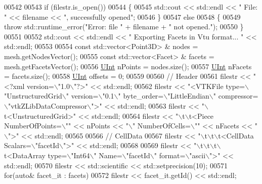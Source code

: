 \begin{DoxyCode}
00542 
00543     \textcolor{keywordflow}{if} (filestr.is\_open())
00544     \{
00545         std::cout << std::endl << \textcolor{stringliteral}{" File: "} << filename << \textcolor{stringliteral}{", successfully opened"};
00546     \}
00547     \textcolor{keywordflow}{else}
00548     \{
00549         \textcolor{keywordflow}{throw} std::runtime\_error(\textcolor{stringliteral}{"Error: file "} + filename + \textcolor{stringliteral}{" not opened."});
00550     \}
00551 
00552     std::cout << std::endl << \textcolor{stringliteral}{" Exporting Facets in Vtu format... "} << std::endl;
00553 
00554     \textcolor{keyword}{const} std::vector<Point3D> & nodes = mesh.getNodesVector();
00555     \textcolor{keyword}{const} std::vector<Facet> & facets = mesh.getFacetsVector();
00556     \hyperlink{namespaceFVCode3D_a4bf7e328c75d0fd504050d040ebe9eda}{UInt} nPoints = nodes.size();
00557     \hyperlink{namespaceFVCode3D_a4bf7e328c75d0fd504050d040ebe9eda}{UInt} nFacets = facets.size();
00558     \hyperlink{namespaceFVCode3D_a4bf7e328c75d0fd504050d040ebe9eda}{UInt} offsets = 0;
00559 
00560     \textcolor{comment}{// Header}
00561     filestr << \textcolor{stringliteral}{"<?xml version=\(\backslash\)"1.0\(\backslash\)"?>"} << std::endl;
00562     filestr << \textcolor{stringliteral}{"<VTKFile type=\(\backslash\)"UnstructuredGrid\(\backslash\)" version=\(\backslash\)"0.1\(\backslash\)" byte\_order=\(\backslash\)"LittleEndian\(\backslash\)" compressor=
      \(\backslash\)"vtkZLibDataCompressor\(\backslash\)">"} << std::endl;
00563     filestr << \textcolor{stringliteral}{"\(\backslash\)t<UnstructuredGrid>"} << std::endl;
00564     filestr << \textcolor{stringliteral}{"\(\backslash\)t\(\backslash\)t<Piece NumberOfPoints=\(\backslash\)""} << nPoints << \textcolor{stringliteral}{"\(\backslash\)" NumberOfCells=\(\backslash\)""} << nFacets << \textcolor{stringliteral}{"\(\backslash\)">"} << 
      std::endl;
00565 
00566     \textcolor{comment}{// CellData}
00567     filestr << \textcolor{stringliteral}{"\(\backslash\)t\(\backslash\)t\(\backslash\)t<CellData Scalars=\(\backslash\)"facetId\(\backslash\)">"} << std::endl;
00568 
00569     filestr << \textcolor{stringliteral}{"\(\backslash\)t\(\backslash\)t\(\backslash\)t\(\backslash\)t<DataArray type=\(\backslash\)"Int64\(\backslash\)" Name=\(\backslash\)"facetId\(\backslash\)" format=\(\backslash\)"ascii\(\backslash\)">"} << std::endl;
00570     filestr << std::scientific << std::setprecision(10);
00571     \textcolor{keywordflow}{for}(\textcolor{keyword}{auto}& facet\_it : facets)
00572         filestr << facet\_it.getId() << std::endl;

\end{DoxyCode}
